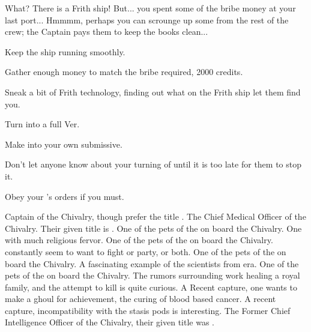 \documentclass[char]{guildcamp4}
\begin{document}
What? There is a Frith ship! But... you spent some of the bribe money at your last port... Hmmmm, perhaps you can scrounge up some from the rest of the crew; the Captain pays them to keep the books clean...

\begin{itemz}[Goals]
	\item Keep the ship running smoothly.
	\item Gather enough money to match the bribe required, 2000 credits.
	\item Sneak a bit of Frith technology, finding out what on the Frith ship let them find you.
	\item Turn \cJulie{} into a full Ver.
	\item Make \cJulie{} into your own submissive.
	\item Don't let anyone know about your turning of \cJulie{} until it is too late for them to stop it.
	\item Obey your \cVone{\Duke}'s orders if you must. 
\end{itemz}

\begin{contacts}
	\contact{\cVone{}} Captain of the Chivalry, though \cVone{\they} prefer the title \cVone{\Duke}.
	\contact{\cVthree{}}The Chief Medical Officer of the Chivalry. Their given title is \cVtwo{\Baron}.
	\contact{\cJoan{}} One of the pets of the \cVone{\Duke} on board the Chivalry. One with much religious fervor.
	\contact{\cJulie{}} One of the pets of the \cVone{\Duke} on board the Chivalry. \cJulie{\they} constantly seem to want to fight or party, or both.
	\contact{\cJames{}} One of the pets of the \cVone{\Duke} on board the Chivalry. A fascinating example of the scientists from \cJames{\their} era.
	\contact{\cRasputin{}} One of the pets of the \cVone{\Duke} on board the Chivalry. The rumors surrounding \cRasputin{\their} work healing a royal family, and the attempt to kill \cRasputin{\them} is quite curious.
	\contact{\cSpite{}} A Recent capture, one \cVone{} wants to make a ghoul for \cSpite{\their} achievement, the curing of blood based cancer.
	\contact{\cPlead{}} A recent capture, \cPlead{\their} incompatibility with the stasis pods is interesting.
	\contact{\cIntel{}} The Former Chief Intelligence Officer of the Chivalry, their given title was \cIntel{\Count}.
\end{contacts}
\end{document}
